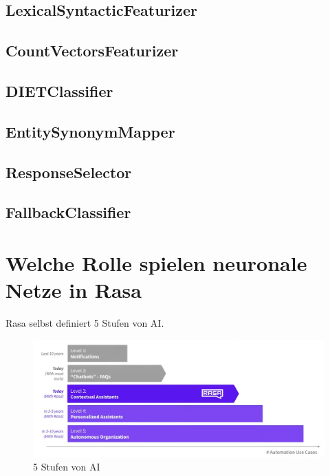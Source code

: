 \subsection{LexicalSyntacticFeaturizer}

\subsection{CountVectorsFeaturizer}

\subsection{DIETClassifier}

\subsection{EntitySynonymMapper}

\subsection{ResponseSelector}

\subsection{FallbackClassifier}

\section{Welche Rolle spielen neuronale Netze in Rasa}

Rasa selbst definiert 5 Stufen von AI\@.\cite{ai5Levels}

\begin{figure}
  \centering
  \includegraphics[scale=0.25]{pics/5_levels_of_ai}
  \caption{5 Stufen von AI~\cite{ai5LevelsVideo}}
  \label{fig:5_levels_of_ai}
\end{figure}

